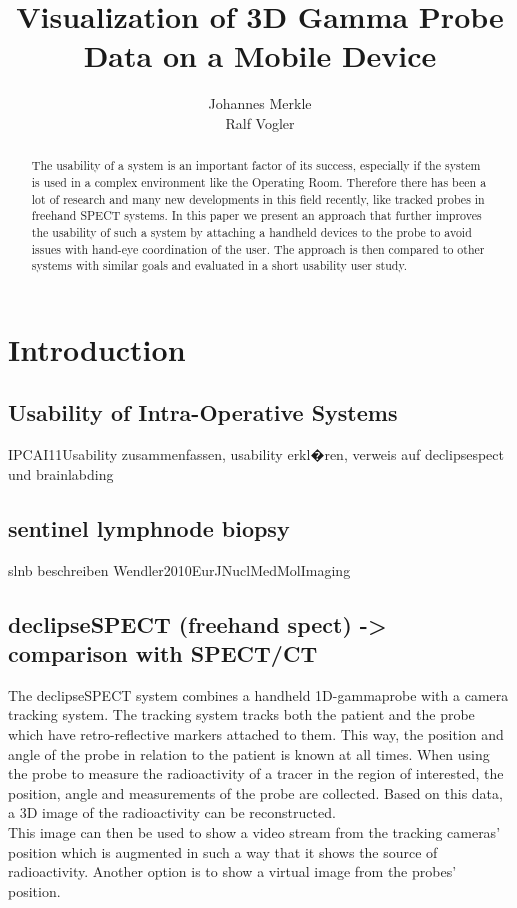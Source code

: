 \documentclass{scrartcl}
\title{Visualization of 3D Gamma Probe Data on a Mobile Device}
\author{Johannes Merkle \\ Ralf Vogler}
\begin{document}
\maketitle

\begin{abstract}
The usability of a system is an important factor of its success, especially if the system is used in a complex environment like the Operating Room. Therefore there has been a lot of research and many new developments in this field recently, like tracked probes in freehand SPECT systems. In this paper we present an approach that further improves the usability of such a system by attaching a handheld devices to the probe to avoid issues with hand-eye coordination of the user. The approach is then compared to other systems with similar goals and evaluated in a short usability user study.
\end{abstract}

\section{Introduction}

\subsection{Usability of Intra-Operative Systems}

IPCAI11Usability zusammenfassen, usability erkl�ren, verweis auf declipsespect und brainlabding

\subsection{sentinel lymphnode biopsy}
slnb beschreiben Wendler2010EurJNuclMedMolImaging


\subsection{declipseSPECT (freehand spect) -> comparison with SPECT/CT}


The declipseSPECT system combines a handheld 1D-gammaprobe with a camera tracking system. The tracking system tracks both the patient and the probe which have retro-reflective markers attached to them. This way, the position and angle of the probe in relation to the patient is known at all times. When using the probe to measure the radioactivity of a tracer in the region of interested, the position, angle and measurements of the probe are collected. Based on this data, a 3D image of the radioactivity can be reconstructed.\\
This image can then be used to show a video stream from the tracking cameras' position which is augmented in such a way that it shows the source of radioactivity. Another option is to show a virtual image from the probes' position.
\end{document}
